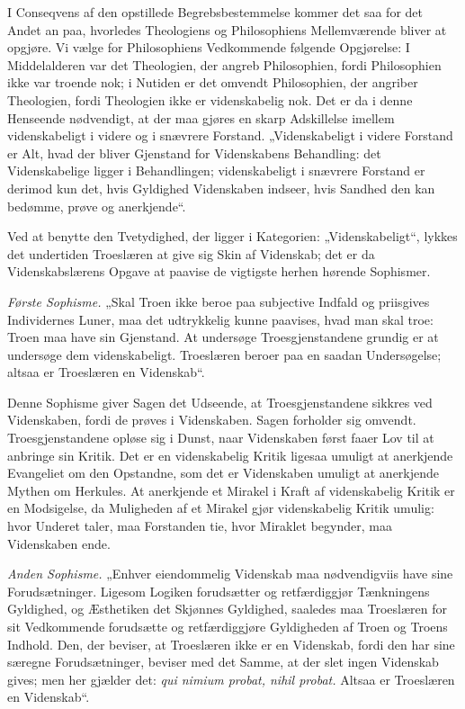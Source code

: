 \documentclass[12pt]{book}
\newcommand{\opage}[1]{\marginnote{\footnotesize\textit{[#1]}}}
\begin{document}
I Conseqvens af den opstillede Begrebsbestemmelse kommer det saa for det Andet an paa, hvorledes Theologiens og Philosophiens Mellemværende bliver at opgjøre. Vi vælge for Philosophiens Vedkommende følgende Opgjørelse: I Middelalderen var det Theologien, der angreb Philosophien, fordi Philosophien ikke var troende nok; i Nutiden er det omvendt Philosophien, der angriber Theologien, fordi Theologien ikke er videnskabelig nok. Det er da i denne Henseende nødvendigt, at der maa gjøres en skarp Adskillelse imellem videnskabeligt i videre og i snævrere Forstand. „Videnskabeligt i videre Forstand er Alt, hvad der bliver Gjenstand for Videnskabens Behandling: det Videnskabelige ligger i Behandlingen; videnskabeligt i snævrere Forstand er derimod kun det, hvis Gyldighed Videnskaben indseer, hvis Sandhed den kan bedømme, prøve og anerkjende“.

Ved at benytte den Tvetydighed, der ligger i Kategorien: „Videnskabeligt“, lykkes det undertiden Troeslæren at give sig Skin af Videnskab; det er da Videnskabslærens Opgave at paavise de vigtigste herhen hørende Sophismer.

\emph{Første Sophisme.} „Skal Troen ikke beroe paa subjective Indfald og priisgives Individernes Luner, maa det udtrykkelig kunne paavises, hvad man skal troe: Troen maa have
\opage{XIII}sin Gjenstand. At undersøge Troesgjenstandene grundig er at undersøge dem videnskabeligt. Troeslæren beroer paa en saadan Undersøgelse; altsaa er Troeslæren en Videnskab“.

Denne Sophisme giver Sagen det Udseende, at Troesgjenstandene sikkres ved Videnskaben, fordi de prøves i Videnskaben. Sagen forholder sig omvendt. Troesgjenstandene opløse sig i Dunst, naar Videnskaben først faaer Lov til at anbringe sin Kritik. Det er en videnskabelig Kritik ligesaa umuligt at anerkjende Evangeliet om den Opstandne, som det er Videnskaben umuligt at anerkjende Mythen om Herkules. At anerkjende et Mirakel i Kraft af videnskabelig Kritik er en Modsigelse, da Muligheden af et Mirakel gjør videnskabelig Kritik umulig: hvor Underet taler, maa Forstanden tie, hvor Miraklet begynder, maa Videnskaben ende.

\emph{Anden Sophisme.} „Enhver eiendommelig Videnskab maa nødvendigviis have sine Forudsætninger. Ligesom Logiken forudsætter og retfærdiggjør Tænkningens Gyldighed, og Æsthetiken det Skjønnes Gyldighed, saaledes maa Troeslæren for sit Vedkommende forudsætte og retfærdiggjøre Gyldigheden af Troen og Troens Indhold. Den, der beviser, at Troeslæren ikke er en Videnskab, fordi den har sine særegne Forudsætninger, beviser med det Samme, at der slet ingen Videnskab gives; men her gjælder det: \textit{qui nimium probat, nihil probat.} Altsaa er Troeslæren en Videnskab“.
\end{document}
